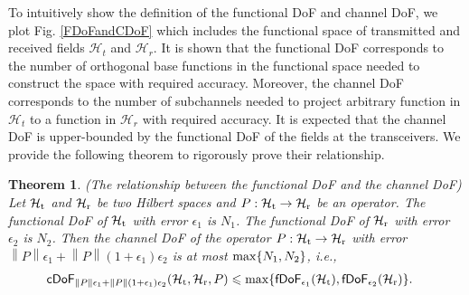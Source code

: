 \documentclass[12pt,draftclsnofoot,journal,onecolumn]{IEEEtran}
\newtheorem{theorem}{Theorem}
\begin{document}
	To intuitively show the definition of the functional DoF and channel DoF, we plot Fig. \ref{FDoFandCDoF} which includes the functional space of transmitted and received fields $\mathcal{H}_t$ and $\mathcal{H}_r$. It is shown that the functional DoF corresponds to the number of orthogonal base functions in the functional space needed to construct the space with required accuracy. Moreover, the channel DoF corresponds to the number of subchannels needed to project arbitrary function in $\mathcal{H}_t$ to a function in $\mathcal{H}_r$ with required accuracy. It is expected that the channel DoF is upper-bounded by the functional DoF of the fields at the transceivers. We provide the following theorem to rigorously prove their relationship. 
	
	\begin{theorem}
		\label{theorem_1}
		(The relationship between the functional DoF and the channel DoF) Let $\mathcal{H}_{\rm t}$ and $\mathcal{H}_{\rm r}$ be two Hilbert spaces and $P:\mathcal{H}_{\rm t} \rightarrow \mathcal{H}_{\rm r}$ be an operator. The functional DoF of $\mathcal{H}_{\rm t}$ with error $\epsilon_1$ is $N_1$. The functional DoF of $\mathcal{H}_{\rm r}$ with error $\epsilon_2$ is $N_2$. Then the channel DoF of the operator $P: \mathcal{H}_{\rm t} \rightarrow \mathcal{H}_{\rm r}$ with error $\left\| P \right\| \epsilon_1 + \left\|  P \right\| (1+\epsilon_1) \epsilon_2$ is at most ${\rm max}\{N_1,N_2\}$, i.e.,
		\begin{equation}
			\begin{aligned}
			&\mathsf{cDoF}_{\left\| P \right\| \epsilon_1 + \left\|  P \right\| (1+\epsilon_1) \epsilon_2}({\mathcal{H}_{\rm t}},{\mathcal{H}_{\rm r}},P) \leqslant {\rm max}\{\mathsf{fDoF}_{\epsilon_1}(\mathcal{H}_{\rm t}),\mathsf{fDoF}_{\epsilon_2}(\mathcal{H}_{\rm r})\}.
			\end{aligned}
		\end{equation}
	\end{theorem}
	
\end{document}
